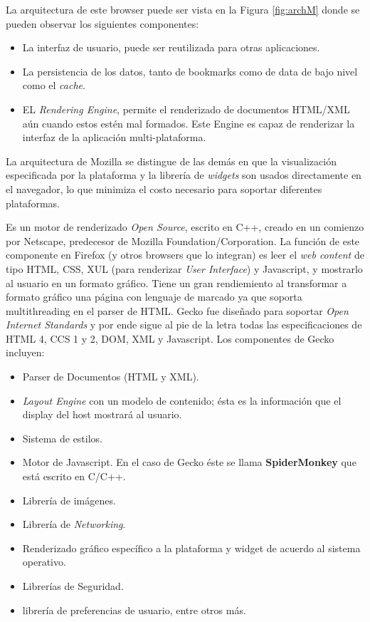         La arquitectura de este browser puede ser vista en la Figura \ref{fig:archM} donde se pueden observar los siguientes componentes:
                \begin{itemize}
                    \item La interfaz de usuario, puede ser reutilizada para otras aplicaciones.
                    \item La persistencia de los datos, tanto de bookmarks como de data de bajo nivel como el \textit{cache}.
                    \item EL \textit{Rendering Engine}, permite el renderizado de documentos HTML/XML aún cuando estos estén mal formados. Este Engine es capaz de renderizar la interfaz de la aplicación multi-plataforma.
                \end{itemize}
        La arquitectura de Mozilla se distingue de las demás en que la visualización especificada por la plataforma y la librería de \textit{widgets} son usados directamente en el navegador, lo que minimiza el costo necesario para soportar diferentes plataformas.

         \label{chap2:Gecko}
         Es un motor de renderizado \textit{Open Source}, escrito en C++, creado en un comienzo por Netscape, predecesor de Mozilla Foundation/Corporation. La función de este componente en Firefox (y otros browsers que lo integran) es leer el \textit{web content} de tipo HTML, CSS, XUL (para renderizar \textit{User Interface}) y Javascript, y mostrarlo al usuario en un formato gráfico. Tiene un gran rendiemiento al transformar a formato gráfico una página con lenguaje de marcado ya que soporta multithreading en el parser de HTML. Gecko fue diseñado para soportar \textit{Open Internet Standards} y por ende sigue al pie de la letra todas las especificaciones de HTML 4, CCS 1 y 2, DOM, XML y Javascript. Los componentes de Gecko incluyen:
             \begin{itemize}
                 \item Parser de Documentos (HTML y XML).
                 \item \textit{Layout Engine} con un modelo de contenido; ésta es la información que el display del host mostrará al usuario.
                 \item Sistema de estilos.
                 \item Motor de Javascript. En el caso de Gecko éste se llama \textbf{SpiderMonkey} que está escrito en C/C++.
                 \item Librería de imágenes.
                 \item Librería de \textit{Networking}.
                 \item Renderizado gráfico específico a la plataforma y widget de acuerdo al sistema operativo.
                 \item Librerías de Seguridad.
                 \item librería de preferencias de usuario, entre otros más.
             \end{itemize}

